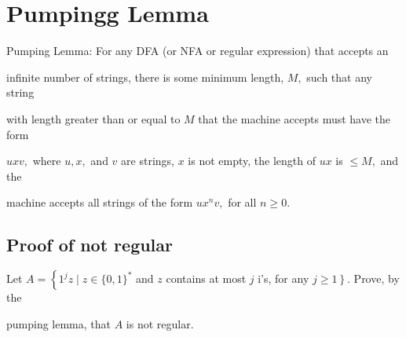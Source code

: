 \documentclass[a4paper]{exam}
\begin{document}
\begin{enumerate}
\begin{solution}
\end{solution}
\end{enumerate}

\section{Pumpingg Lemma}

Pumping Lemma: For any DFA (or NFA or regular expression) that accepts an

infinite number of strings, there is some minimum length, \(M,\) such that any string

with length greater than or equal to \(M\) that the machine accepts must have the form

\(u x v,\) where \(u, x,\) and \(v\) are strings, \(x\) is not empty, the length of \(u x\) is \(\leq M,\) and the

machine accepts all strings of the form \(u x^{n} v,\) for all \(n \geq 0\).

\subsection{Proof of not regular} Let \(A=\left\{1^{j} z \mid z \in\{0,1\}^{*}\right.\) and \(z\) contains at most \(j\) i's, for any \(\left.j \geq 1\right\} .\) Prove, by the

pumping lemma, that \(A\) is not regular.\\
\end{document}
